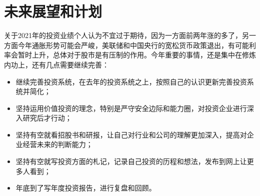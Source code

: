 \documentclass[UTF8,a4paper,12pt,lang=cn,fontset = windows]{elegantpaper} %
\begin{document}
\section{未来展望和计划}
关于2021年的投资业绩个人认为不宜过于期待，因为一方面前两年涨的多了，另一方面今年通胀形势可能会严峻，美联储和中国央行的宽松货币政策退出，有可能利率会暂时上升，总体对于股市是有压制的作用。今年重要的事情，还是集中在修炼内功上，还有几点需要继续完善：
\begin{itemize}
    \item \noindent 继续完善投资系统，在去年的投资系统之上，按照自己的认识更新完善投资系统并简化；
    
    \item \noindent 坚持运用价值投资的理念，特别是严守安全边际和能力圈，对投资企业进行深入研究后才行动；
    
    \item \noindent 坚持有空就看招股书和研报，让自己对行业和公司的理解更加深入，提高对企业经营未来的判断能力；
    \item \noindent 坚持有空就写投资方面的札记，记录自己投资的历程和想法，发布到网上让更多人看到；
    \item \noindent 年底到了写年度投资报告，进行复盘和回顾。
    \end{itemize}
\end{document}
